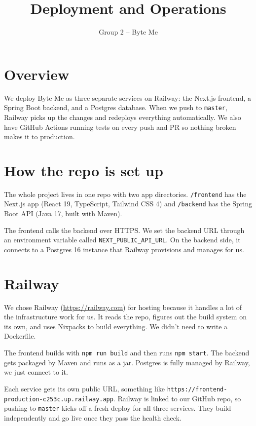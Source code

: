 \documentclass[a4paper,11pt]{article}
\title{Deployment and Operations}
\author{Group 2 -- Byte Me}
\date{}
\begin{document}
\maketitle

\section{Overview}

We deploy Byte Me as three separate services on Railway: the Next.js frontend, a Spring Boot backend, and a Postgres database. When we push to \texttt{master}, Railway picks up the changes and redeploys everything automatically. We also have GitHub Actions running tests on every push and PR so nothing broken makes it to production.

\section{How the repo is set up}

The whole project lives in one repo with two app directories. \texttt{/frontend} has the Next.js app (React 19, TypeScript, Tailwind CSS 4) and \texttt{/backend} has the Spring Boot API (Java 17, built with Maven).

The frontend calls the backend over HTTPS. We set the backend URL through an environment variable called \texttt{NEXT\_PUBLIC\_API\_URL}. On the backend side, it connects to a Postgres 16 instance that Railway provisions and manages for us.

\section{Railway}

We chose Railway (\url{https://railway.com}) for hosting because it handles a lot of the infrastructure work for us. It reads the repo, figures out the build system on its own, and uses Nixpacks to build everything. We didn't need to write a Dockerfile.

The frontend builds with \texttt{npm run build} and then runs \texttt{npm start}. The backend gets packaged by Maven and runs as a jar. Postgres is fully managed by Railway, we just connect to it.

Each service gets its own public URL, something like \texttt{https://frontend-production-c253c.up.railway.app}. Railway is linked to our GitHub repo, so pushing to \texttt{master} kicks off a fresh deploy for all three services. They build independently and go live once they pass the health check.
\end{document}
